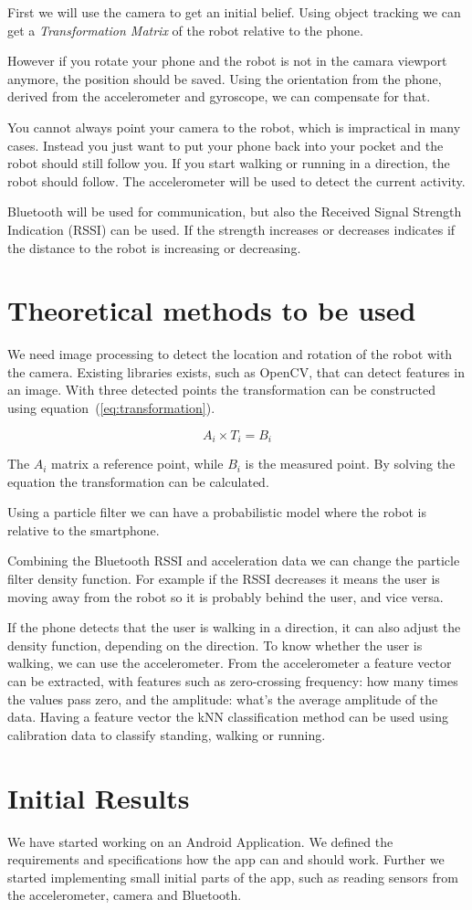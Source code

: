 \documentclass{article}
\begin{document}
First we will use the camera to get an initial belief. Using object tracking
we can get a \emph{Transformation Matrix} of the robot relative to the phone.

However if you rotate your phone and the robot is not in the camara viewport
anymore, the position should be saved. Using the orientation from the phone,
derived from the accelerometer and gyroscope, we can compensate for that.

You cannot always point your camera to the robot, which is impractical in many
cases. Instead you just want to put your phone back into your pocket and the
robot should still follow you. If you start walking or running in a direction,
the robot should follow. The accelerometer will be used to detect the current
activity.

Bluetooth will be used for communication, but also the Received Signal Strength
Indication (RSSI) can be used. If the strength increases or decreases indicates
if the distance to the robot is increasing or decreasing.

\section{Theoretical methods to be used}

We need image processing to detect the location and rotation of the robot with
the camera. Existing libraries exists, such as OpenCV, that can detect features
in an image. With three detected points the transformation can be constructed
using equation~(\ref{eq:transformation}).

\begin{equation}
A_{i} \times T_{i} = B_{i}
\label{eq:transformation}
\end{equation}

The $A_{i}$ matrix a reference point, while $B_{i}$ is the measured point. By
solving the equation the transformation can be calculated.

Using a particle filter we can have a probabilistic model where the robot is
relative to the smartphone.

Combining the Bluetooth RSSI and acceleration data we can change the particle
filter density function. For example if the RSSI decreases it means the user is
moving away from the robot so it is probably behind the user, and vice versa.

If the phone detects that the user is walking in a direction, it can also
adjust the density function, depending on the direction. To know whether the
user is walking, we can use the accelerometer. From the accelerometer a feature
vector can be extracted, with features such as zero-crossing frequency: how
many times the values pass zero, and the amplitude: what's the average
amplitude of the data. Having a feature vector the kNN classification method
can be used using calibration data to classify standing, walking or running.

\section{Initial Results}

We have started working on an Android Application. We defined the requirements
and specifications how the app can and should work. Further we started
implementing small initial parts of the app, such as reading sensors from the
accelerometer, camera and Bluetooth.
\end{document}
